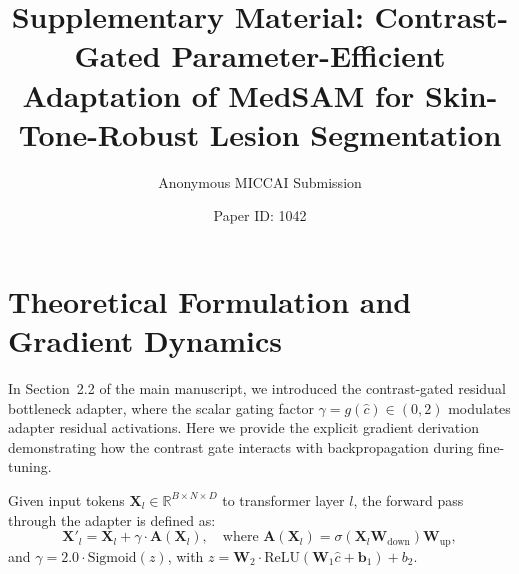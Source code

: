 \documentclass[runningheads]{llncs}
\begin{document}
\title{Supplementary Material: Contrast-Gated Parameter-Efficient Adaptation of MedSAM for Skin-Tone-Robust Lesion Segmentation}

\author{Anonymous MICCAI Submission \and Paper ID: 1042}

\maketitle

\appendix

\section{Theoretical Formulation and Gradient Dynamics}
\label{sec:gradient_dynamics}
In Section~2.2 of the main manuscript, we introduced the contrast-gated residual bottleneck adapter, where the scalar gating factor $\gamma = g(\hat{c}) \in (0, 2)$ modulates adapter residual activations. Here we provide the explicit gradient derivation demonstrating how the contrast gate interacts with backpropagation during fine-tuning.

Given input tokens $\mathbf{X}_l \in \mathbb{R}^{B \times N \times D}$ to transformer layer $l$, the forward pass through the adapter is defined as:
\begin{equation}
\mathbf{X}'_l = \mathbf{X}_l + \gamma \cdot \mathbf{A}(\mathbf{X}_l), \quad \text{where } \mathbf{A}(\mathbf{X}_l) = \sigma(\mathbf{X}_l \mathbf{W}_{\text{down}}) \mathbf{W}_{\text{up}},
\end{equation}
and $\gamma = 2.0 \cdot \text{Sigmoid}(z)$, with $z = \mathbf{W}_2 \cdot \text{ReLU}(\mathbf{W}_1 \hat{c} + \mathbf{b}_1) + b_2$.
\end{document}
